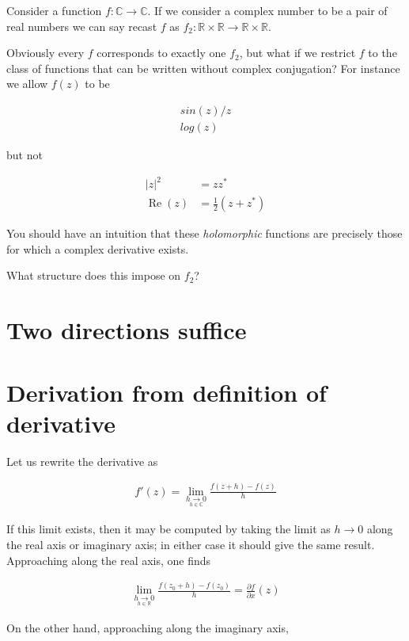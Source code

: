 \documentclass{article}
\begin{document}
Consider a function $f:\mathbb{C} \rightarrow \mathbb{C}$. If we consider a complex number to be a pair of real numbers we can say recast $f$ as $f_2:\mathbb{R} \times \mathbb{R} \rightarrow \mathbb{R} \times \mathbb{R}$.

Obviously every $f$ corresponds to exactly one $f_2$, but what if we restrict $f$ to the class of functions that can be written without complex conjugation? For instance we allow $f(z)$ to be

\begin{align}
sin(z)/z \\
log(z)
\end{align}

but not

\begin{align}
|z|^2 &= zz^* \\
\operatorname{Re}(z) &= \frac{1}{2}(z + z^*)
\end{align}

You should have an intuition that these \emph{holomorphic} functions are precisely those for which a complex derivative exists.

What structure does this impose on $f_2$?

\section{Two directions suffice}

\section{Derivation from definition of derivative}

Let us rewrite the derivative as

\begin{align}
f'(z) = \lim_{\underset{h\in\mathbb{C}}{h\to 0}} \frac{f(z+h) - f(z)}{h}
\end{align}


If this limit exists, then it may be computed by taking the limit as $h \rightarrow 0$ along the real axis or imaginary axis; in either case it should give the same result.  Approaching along the real axis, one finds

\begin{align}
\lim_{\underset{h\in\mathbb{R}}{h\to 0}} \frac{f(z_0+h)-f(z_0)}{h} = \frac{\partial f}{\partial x}(z)
\end{align}

On the other hand, approaching along the imaginary axis,
\end{document}
